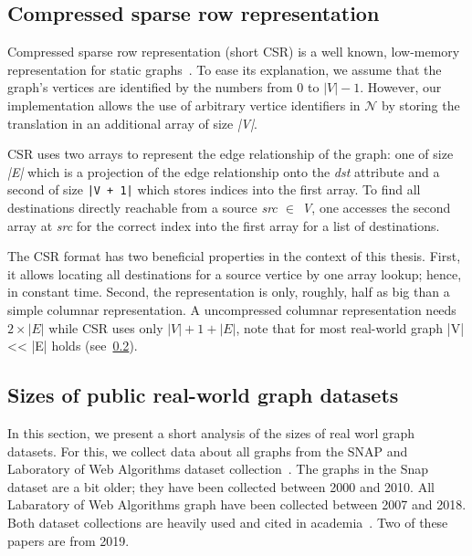 \subsection{Compressed sparse row representation}\label{subsec:csr-background}
Compressed sparse row representation (short CSR) is a well known, low-memory representation for static graphs~\cite{csr,csr-first}.
To ease its explanation, we assume that the graph's vertices are identified by the numbers from 0 to $|V| - 1$.
However, our implementation allows the use of arbitrary vertice identifiers in $\mathcal{N}$ by storing the translation in an additional
array of size \textit{|V|}.

CSR uses two arrays to represent the edge relationship of the graph: one of size \textit{|E|} which is a projection of the edge relationship
onto the \textit{dst} attribute and a second of size \texttt{|V + 1|} which stores indices into the first array.
To find all destinations directly reachable from a source \textit{src $\in$ V}, one accesses the second array at \textit{src} for the
correct index into the first array for a list of destinations.

The CSR format has two beneficial properties in the context of this thesis.
First, it allows locating all destinations for a source vertice by one array lookup;
hence, in constant time.
Second, the representation is only, roughly, half as big than a simple columnar representation.
A uncompressed columnar representation needs $2 \times |E|$ while CSR uses only $|V| + 1 + |E|$, note that for most real-world graph |V|
<< |E| holds (see~\cref{subsec:graph-analysis}).

\subsection{Sizes of public real-world graph datasets} \label{subsec:graph-analysis}
In this section, we present a short analysis of the sizes of real worl graph datasets.
For this, we collect data about all graphs from the SNAP and Laboratory of Web Algorithms dataset collection~\cite{snap-datasets,
labaratory-of-web-algorithms-datasets}.
The graphs in the Snap dataset are a bit older;
they have been collected between 2000 and 2010.
All Labaratory of Web Algorithms graph have been collected between 2007 and 2018.
Both dataset collections are heavily used and cited in academia~\cite{ammar2018distributed,olddog,myria-detailed,fractal,longbin}.
Two of these papers are from 2019.

